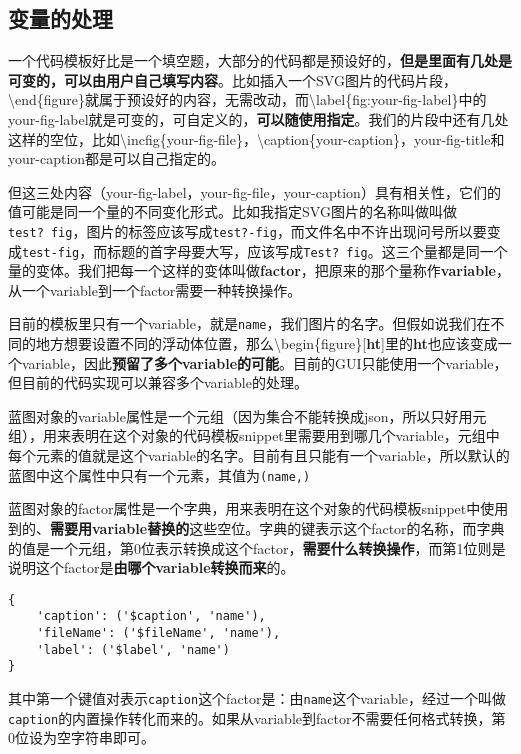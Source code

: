 \documentclass[AutoFakeBold,letterpaper,12pt,hidelinks]{article}
\begin{document}
\subsection{变量的处理}

一个代码模板好比是一个填空题，大部分的代码都是预设好的，\textbf{但是里面有几处是可变的，可以由用户自己填写内容}。比如插入一个SVG图片的代码片段，\textbackslash end\{figure\}就属于预设好的内容，无需改动，而\textbackslash label\{fig:your-fig-label\}中的your-fig-label就是可变的，可自定义的，\textbf{可以随使用指定}。我们的片段中还有几处这样的空位，比如\textbackslash incfig\{your-fig-file\}，\textbackslash caption\{your-caption\}，your-fig-title和your-caption都是可以自己指定的。

但这三处内容（your-fig-label，your-fig-file，your-caption）具有相关性，它们的值可能是同一个量的不同变化形式。比如我指定SVG图片的名称叫做叫做\texttt{test?\ fig}，图片的标签应该写成\texttt{test?-fig}，而文件名中不许出现问号所以要变成\texttt{test-fig}，而标题的首字母要大写，应该写成\texttt{Test?\ fig}。这三个量都是同一个量的变体。我们把每一个这样的变体叫做\textbf{factor}，把原来的那个量称作\textbf{variable}，从一个variable到一个factor需要一种转换操作。

目前的模板里只有一个variable，就是\texttt{name}，我们图片的名字。但假如说我们在不同的地方想要设置不同的浮动体位置，那么\textbackslash begin\{figure\}{[}\textbf{ht}{]}里的\textbf{ht}也应该变成一个variable，因此\textbf{预留了多个variable的可能}。目前的GUI只能使用一个variable，但目前的代码实现可以兼容多个variable的处理。

蓝图对象的variable属性是一个元组（因为集合不能转换成json，所以只好用元组），用来表明在这个对象的代码模板snippet里需要用到哪几个variable，元组中每个元素的值就是这个variable的名字。目前有且只能有一个variable，所以默认的蓝图中这个属性中只有一个元素，其值为\texttt{(\textquotesingle{}name\textquotesingle{},)}

蓝图对象的factor属性是一个字典，用来表明在这个对象的代码模板snippet中使用到的、\textbf{需要用variable替换的}这些空位。字典的键表示这个factor的名称，而字典的值是一个元组，第0位表示转换成这个factor，\textbf{需要什么转换操作}，而第1位则是说明这个factor是\textbf{由哪个variable转换而来}的。

\begin{verbatim}
{
    'caption': ('$caption', 'name'),
    'fileName': ('$fileName', 'name'),
    'label': ('$label', 'name')
}
\end{verbatim}

其中第一个键值对表示\texttt{caption}这个factor是：由\texttt{name}这个variable，经过一个叫做\texttt{caption}的内置操作转化而来的。如果从variable到factor不需要任何格式转换，第0位设为空字符串即可。
\end{document}
